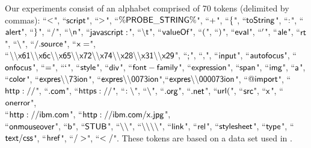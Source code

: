 Our experiments consist of an alphabet comprised of 70 tokens (delimited by commas): ``$\sf{<}$", ``$\sf{script}$", ``$\sf{>}$", ``$\sf{\%PROBE\_STRING\%}$", ``$\sf{+}$", ``$\sf{\{}$", ``$\sf{toString}$", ``$\sf{:}$", ``$\sf{alert}$", ``$\sf{\}}$", ``$\sf{/}$", ``$\sf{\backslash n}$", ``$\sf{javascript:}$", ``$\sf{\backslash t}$", ``$\sf{valueOf}$", ``$\sf{(}$", ``$\sf{)}$", ``$\sf{eval}$", ``$\sf{'}$", ``$\sf{ale}$", ``$\sf{rt}$", ``$\sf{\backslash }$", ``$\sf{/.source}$", ``$\sf{x=}$",\\ ``$\sf{\backslash \backslash x61\backslash \backslash x6c\backslash \backslash x65\backslash \backslash x72\backslash \backslash x74\backslash \backslash x28\backslash \backslash x31\backslash \backslash x29}$", ``$\sf{;}$", ``$\sf{,}$", ``$\sf{input}$", ``$\sf{autofocus}$", ``$\sf{onfocus}$", ``$\sf{=}$", ``$\sf{`}$", ``$\sf{style}$", ``$\sf{div}$", ``$\sf{font-family}$", ``$\sf{expression}$", ``$\sf{span}$", ``$\sf{img}$", ``$\sf{a}$", ``$\sf{color}$", ``$\sf{expres\backslash \backslash 73ion}$", ``$\sf{expres\backslash \backslash 0073ion}$",``$\sf{expres\backslash \backslash 000073ion}$", ``$\sf{@import}$", ``$\sf{http://}$", ``$\sf{.com}$", ``$\sf{https://}$", ``$\sf{:\backslash }$", ``$\sf{\backslash }$", ``$\sf{.org}$", ``$\sf{.net}$", ``$\sf{url(}$", ``$\sf{src}$", ``$\sf{x}$", ``$\sf{onerror}$",\\ ``$\sf{http://ibm.com}$", ``$\sf{http://ibm.com/x.jpg}$",\\ ``$\sf{onmouseover}$", ``$\sf{b}$", ``$\sf{STUB}$", ``$\sf{\backslash \backslash }$", ``$\sf{\backslash \backslash \backslash \backslash }$", ``$\sf{link}$", ``$\sf{rel}$", ``$\sf{stylesheet}$", ``$\sf{type}$", ``$\sf{text/css}$", ``$\sf{href}$", ``$\sf{/>}$", ``$\sf{</}$". These tokens are based on a data set used in \cite{TrippIssta:2013}.


